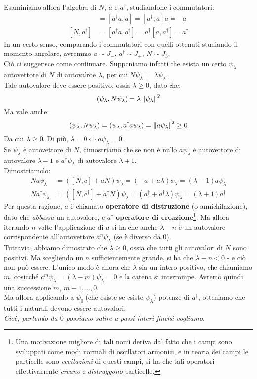 \documentclass[../../FisicaTeorica.tex]{subfiles}
\begin{document}
Esaminiamo allora l'algebra di $N$, $a$ e $a^\dag$, studiandone i commutatori:
\begin{align*}
[N,a] &= [a^\dag a, a] = [a^\dag, a]a = -a\\
[N,a^\dag] &= [a^\dag a, a^\dag] = a^\dag[a, a^\dag] = a^\dag
\end{align*}
In un certo senso, comparando i commutatori con quelli ottenuti studiando il momento angolare, avremmo $a\sim J_-$, $a^\dag \sim J_+$, $N\sim J_3$.\\
Ciò ci suggerisce come continuare. Supponiamo infatti che esista un certo $\psi_\lambda$ autovettore di $N$ di autovalroe $\lambda$, per cui $N\psi_\lambda =\ \lambda \psi_\lambda$.\\
Tale autovalore deve essere positivo, ossia $\lambda \geq 0$, dato che:
\[
(\psi_\lambda, N\psi_\lambda) = \lambda \left\lVert\psi_\lambda\right\rVert^2
\]
Ma vale anche:
\[
(\psi_\lambda, N\psi_\lambda) = (\psi_\lambda, a^\dag a\psi_\lambda) = \left\lVert a\psi_\lambda\right\rVert^2 \geq 0
\]
Da cui $\lambda \geq 0$. Di più, $\lambda = 0 \Leftrightarrow a\psi_\lambda = 0$.\\

Se $\psi_\lambda$ è autovettore di $N$, dimostriamo che se non è nullo $a\psi_\lambda$ è autovettore di autovalore $\lambda-1$ e $a^\dag\psi_\lambda$ di autovalore $\lambda+1$.\\
Dimostriamolo:
\begin{align*}
N a\psi_\lambda&= ([N,a]+aN)\psi_\lambda = (-a +a\lambda) \psi_\lambda = (\lambda-1)a \psi_\lambda\\
N a^\dag \psi_\lambda &= ([N, a^\dag]+a^\dag N) \psi_\lambda = (a^\dag + a^\dag \lambda) \psi_\lambda = (\lambda+1) a^\dag
\end{align*} 
Per questa ragione, $a$ è chiamato \textbf{operatore di distruzione} (o annichilazione), dato che \textit{abbassa} un autovalore, e $a^\dag$ \textbf{operatore di creazione}\footnote{Una motivazione migliore di tali nomi deriva dal fatto che i campi sono sviluppati come modi normali di oscillatori armonici, e in teoria dei campi le particelle sono \textit{eccitazioni} di questi campi, si ha che tali operatori effettivamente \textit{creano} e \textit{distruggono} particelle.}.
Ma allora iterando $n$-volte l'applicazione di $a$ si ha che anche $\lambda-n$ è un autovalore corrispondente all'autovettore $a^n\psi_\lambda$ (se è diverso da $0$).\\
Tuttavia, abbiamo dimostrato che $\lambda \geq 0$, ossia che tutti gli autovalori di $N$ sono positivi. Ma scegliendo un $n$ sufficientemente grande, si ha che $\lambda-n < 0$ - e ciò non può essere. L'unico modo è allora che $\lambda$ sia un intero positivo, che chiamiamo $m$, cosicché $a^m\psi_\lambda = (\lambda-m)\psi_\lambda = 0$ e la catena si interrompe. Avremo quindi una successione $m$, $m-1, \dots, 0$.\\
Ma allora applicando a $\psi_0$ (che esiste se esiste $\psi_\lambda$) potenze di $a^\dag$, otteniamo che tutti i naturali devono essere autovalori.\\
\textit{Cioè, partendo da $0$ possiamo salire a passi interi finché vogliamo}.\\
\end{document}
